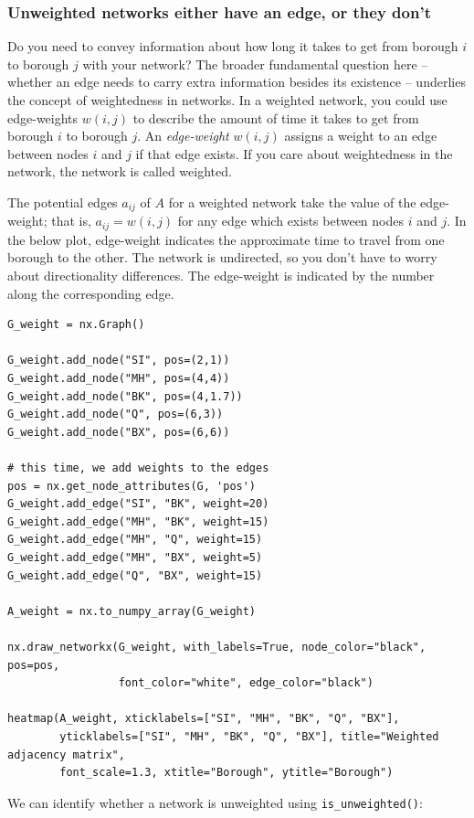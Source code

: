 \subsubsection{Unweighted networks either have an edge, or they don't}

Do you need to convey information about how long it takes to get from borough $i$ to borough $j$ with your network? The broader fundamental question here -- whether an edge needs to carry extra information besides its existence -- underlies the concept of {weightedness} in networks. In a weighted network, you could use {edge-weights} $w(i, j)$ to describe the amount of time it takes to get from borough $i$ to borough $j$. An \textit{edge-weight} $w(i,j)$ assigns a weight to an edge between nodes $i$ and $j$ if that edge exists. If you care about weightedness in the network, the network is called {weighted}. 

The potential edges $a_{ij}$ of $A$ for a weighted network take the value of the edge-weight; that is, $a_{ij} = w(i, j)$ for any edge which exists between nodes $i$ and $j$. In the below plot, edge-weight indicates the approximate time to travel from one borough to the other. The network is undirected, so you don't have to worry about directionality differences. The edge-weight is indicated by the number along the corresponding edge.

\begin{lstlisting}[style=python]
G_weight = nx.Graph()

G_weight.add_node("SI", pos=(2,1))
G_weight.add_node("MH", pos=(4,4))
G_weight.add_node("BK", pos=(4,1.7))
G_weight.add_node("Q", pos=(6,3))
G_weight.add_node("BX", pos=(6,6))

# this time, we add weights to the edges
pos = nx.get_node_attributes(G, 'pos')
G_weight.add_edge("SI", "BK", weight=20)
G_weight.add_edge("MH", "BK", weight=15)
G_weight.add_edge("MH", "Q", weight=15)
G_weight.add_edge("MH", "BX", weight=5)
G_weight.add_edge("Q", "BX", weight=15)

A_weight = nx.to_numpy_array(G_weight)

nx.draw_networkx(G_weight, with_labels=True, node_color="black", pos=pos,
                 font_color="white", edge_color="black")

heatmap(A_weight, xticklabels=["SI", "MH", "BK", "Q", "BX"],
        yticklabels=["SI", "MH", "BK", "Q", "BX"], title="Weighted adjacency matrix", 
        font_scale=1.3, xtitle="Borough", ytitle="Borough")
\end{lstlisting}
We can identify whether a network is unweighted using \texttt{is\_unweighted()}:



